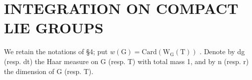 \section{INTEGRATION ON COMPACT LIE GROUPS}

We retain the notations of §4; put \(w(\mathrm{G}) = \mathrm{Card}(\mathrm{W}_{\mathrm{G}}(\mathrm{T}))\) . Denote by dg (resp. dt) the Haar measure on G (resp. T) with total mass 1, and by n (resp. r) the dimension of G (resp. T).


